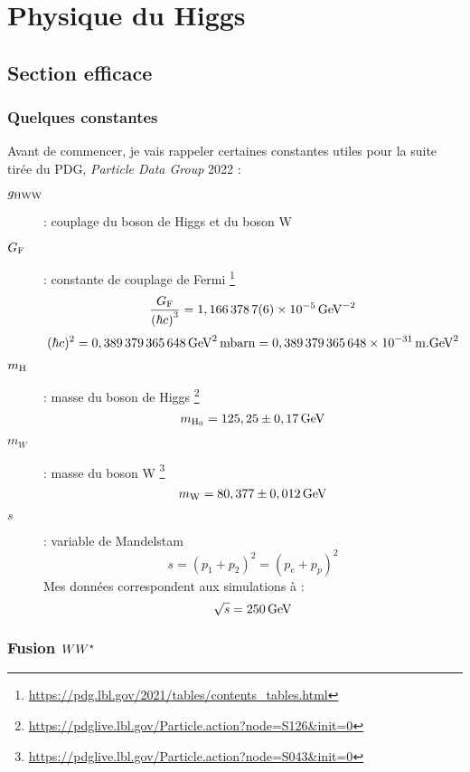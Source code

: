 
\section{Physique du Higgs}

\subsection{Section efficace}

\subsubsection{Quelques constantes}
Avant de commencer, je vais rappeler certaines constantes utiles pour la suite tirée du PDG, \textit{Particle Data Group} 2022\cite{Workman:2022ynf} :
\begin{description}

	\item[$g_\mathrm{HWW}$] : couplage du boson de Higgs et du boson W

	\item[$G_\mathrm{F}$] : constante de couplage de Fermi
	\footnote{\url{https://pdg.lbl.gov/2021/tables/contents_tables.html}}
	$$ \frac{G_\mathrm{F}}{\left(\hbar c\right)^3} = 1,166\,378\,7(6) \times 10^{-5}\, \mathrm{GeV}^{-2} $$
	$$ (\hbar c)^2 = 0,389\,379\,365\,648 \, \mathrm{GeV}^2 \, \mathrm{mbarn} = 0,389\,379\,365\,648 \times 10^{-31} \, \mathrm{m}.\mathrm{GeV}^2 $$
	
	\item[$m_\mathrm{H}$] : masse du boson de Higgs
	\footnote{\url{https://pdglive.lbl.gov/Particle.action?node=S126&init=0}}
	$$ m_\mathrm{H_0} = 125,25 \pm 0,17 \, \mathrm{GeV} $$
		
	\item[$m_W$] : masse du boson W
	\footnote{\url{https://pdglive.lbl.gov/Particle.action?node=S043&init=0}}
	$$ m_\mathrm{W} = 80,377 \pm 0,012 \, \mathrm{GeV} $$
	
	\item[$s$] : variable de Mandelstam
	$$ s = \left(p_1 + p_2\right)^2 = \left(p_{e} + p_{p}\right)^2 $$
	Mes données correspondent aux simulations à : 
	$$ \sqrt{s} = 250\, \mathrm{GeV} $$

		
\end{description}


\subsubsection{Fusion $WW^{\star}$ \cite{desy}}


